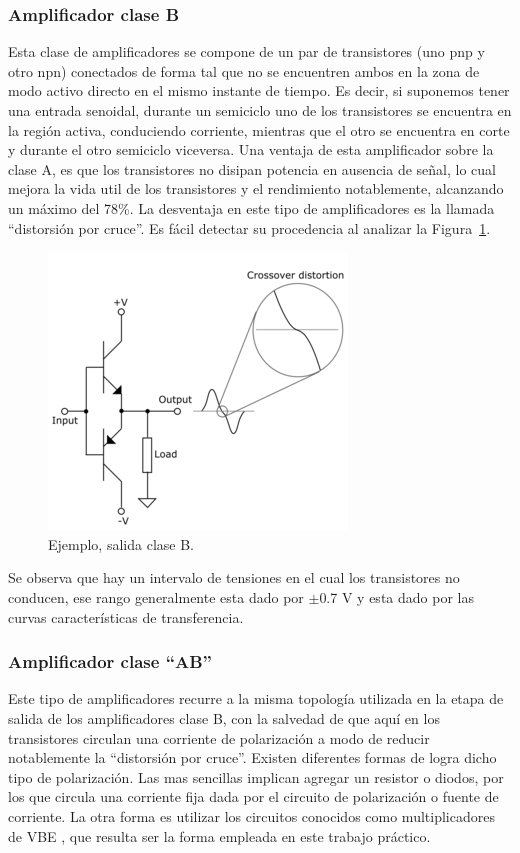 \medskip 
\subsubsection{Amplificador clase B}

Esta clase de amplificadores se compone de un par de transistores (uno pnp y otro npn) conectados de forma tal que no se encuentren ambos en la zona de modo activo directo en el mismo instante de tiempo. Es decir, si suponemos tener una entrada senoidal, durante un semiciclo uno de los transistores se encuentra en la región activa, conduciendo corriente, mientras que el otro se encuentra en corte y durante el otro semiciclo viceversa.
 Una ventaja de esta amplificador sobre la clase A, es que los transistores no disipan potencia en ausencia de señal, lo cual mejora la vida util de los transistores y el rendimiento notablemente, alcanzando un máximo del 78\%.
 La desventaja en este tipo de amplificadores es la llamada “distorsión por cruce”. Es fácil detectar su procedencia al analizar la Figura~\ref{ampliB}.

\begin{figure}[H]
\centering
\includegraphics[scale=0.8]{img/ampliB.png}
\caption{Ejemplo, salida clase B.}
\label{ampliB} 
\end{figure}


Se observa que hay un intervalo de tensiones en el cual los transistores no conducen, ese rango generalmente esta dado por $\pm$0.7 V y esta dado por las curvas características de transferencia.

\medskip 
\subsubsection{Amplificador clase “AB”}


 Este tipo de amplificadores recurre a la misma topología utilizada en la etapa de salida de los amplificadores clase B, con la salvedad de que aquí en los transistores circulan una corriente de polarización a modo de reducir notablemente la “distorsión por cruce”.
 Existen diferentes formas de logra dicho tipo de polarización. Las mas sencillas implican agregar un resistor o diodos, por los que circula una corriente fija dada por el circuito de polarización o fuente de corriente. La otra forma es utilizar los circuitos conocidos como multiplicadores de VBE , que resulta ser la forma empleada en este trabajo práctico.

